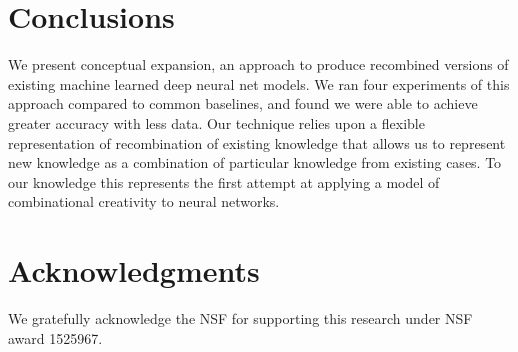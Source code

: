 \documentclass[letterpaper]{article}
\begin{document}
\section{Conclusions}

We present conceptual expansion, an approach to produce recombined versions of existing machine learned deep neural net models. We ran four experiments of this approach compared to common baselines, and found we were able to achieve greater accuracy with less data. Our technique relies upon a flexible representation of recombination of existing knowledge that allows us to represent new knowledge as a combination of particular knowledge from existing cases. To our knowledge this represents the first attempt at applying a model of combinational creativity to neural networks.

\section{Acknowledgments}

We gratefully acknowledge the NSF for supporting this research under NSF award 1525967.



\end{document}
